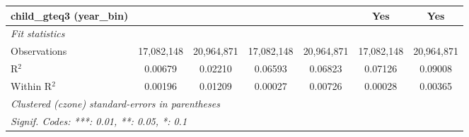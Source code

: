 \begin{tabular}{lcccccc}
child\_gteq3 (year\_bin) &  &  &  &  & Yes & Yes\\
\midrule \emph{Fit statistics}&  & & & & & \\
Observations & 17,082,148&20,964,871&17,082,148&20,964,871&17,082,148&20,964,871\\
R$^2$ & 0.00679&0.02210&0.06593&0.06823&0.07126&0.09008\\
Within R$^2$ & 0.00196&0.01209&0.00027&0.00726&0.00028&0.00365\\
\midrule\midrule\multicolumn{7}{l}{\emph{Clustered (czone) standard-errors in parentheses}}\\
\multicolumn{7}{l}{\emph{Signif. Codes: ***: 0.01, **: 0.05, *: 0.1}}\\
\end{tabular}


